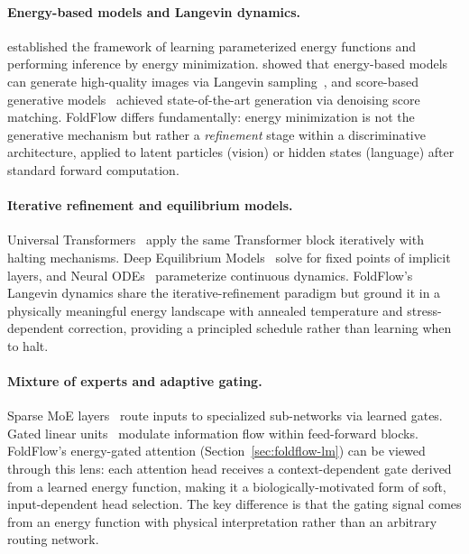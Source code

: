 \documentclass[10pt]{article}
\begin{document}
\paragraph{Energy-based models and Langevin dynamics.}
\citet{lecun2006tutorial} established the framework of learning
parameterized energy functions and performing inference by energy
minimization.  \citet{du2019implicit} showed that energy-based models
can generate high-quality images via Langevin
sampling~\citep{welling2011bayesian}, and score-based generative
models~\citep{song2019generative} achieved state-of-the-art generation
via denoising score matching.  FoldFlow differs fundamentally: energy
minimization is not the generative mechanism but rather a
\emph{refinement} stage within a discriminative architecture, applied to
latent particles (vision) or hidden states (language) after standard
forward computation.

\paragraph{Iterative refinement and equilibrium models.}
Universal Transformers~\citep{dehghani2019universal} apply the same
Transformer block iteratively with halting mechanisms.  Deep Equilibrium
Models~\citep{bai2019deep} solve for fixed points of implicit layers,
and Neural ODEs~\citep{chen2018neural} parameterize continuous dynamics.
FoldFlow's Langevin dynamics share the iterative-refinement paradigm
but ground it in a physically meaningful energy landscape with annealed
temperature and stress-dependent correction, providing a principled
schedule rather than learning when to halt.

\paragraph{Mixture of experts and adaptive gating.}
Sparse MoE layers~\citep{shazeer2017outrageously, fedus2022switch}
route inputs to specialized sub-networks via learned gates.  Gated
linear units~\citep{dauphin2017language, shazeer2020glu} modulate
information flow within feed-forward blocks.  FoldFlow's energy-gated
attention (Section~\ref{sec:foldflow-lm}) can be viewed through this
lens: each attention head receives a context-dependent gate derived from
a learned energy function, making it a biologically-motivated form of
soft, input-dependent head selection.  The key difference is that the
gating signal comes from an energy function with physical interpretation
rather than an arbitrary routing network.
\end{document}
